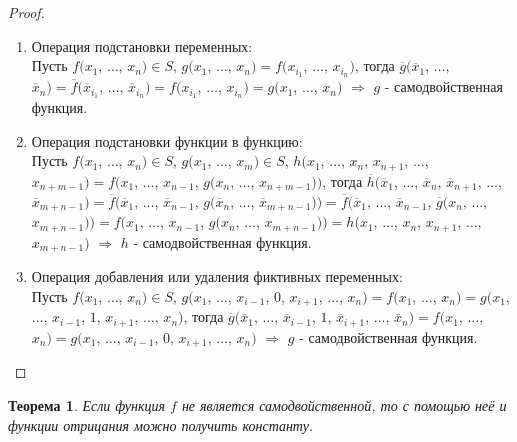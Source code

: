 \documentclass[a4paper, 12pt]{article}
\theoremstyle{definition}
\theoremstyle{plain}
\newtheorem*{theorem}{Теорема}
\theoremstyle{remark}
\begin{document}
  \begin{proof}
    \begin{enumerate}
      \item Операция подстановки переменных:\\
      Пусть $f(x_1$, $\ldots$, $x_n)\in S$, $g(x_1$, $\ldots$, $x_n)=f(x_{i_1}$, $\ldots$, $x_{i_n})$, тогда $\overline{g}(\overline{x}_1$, $\ldots$, $\overline{x}_n)=\overline{f}(\overline{x}_{i_1}$, $\ldots$, $\overline{x}_{i_n})=f(x_{i_1}$, $\ldots$, $x_{i_n})=g(x_1$, $\ldots$, $x_n)$ $\Longrightarrow$ $g$ - самодвойственная функция.
      \item Операция подстановки функции в функцию:\\
      Пусть $f(x_1$, $\ldots$, $x_n)\in S$, $g(x_1$, $\ldots$, $x_m)\in S$, $h(x_1$, $\ldots$, $x_n$, $x_{n+1}$, $\ldots$, $x_{n+m-1})=f(x_1$, $\ldots$, $x_{n-1}$, $g(x_n$, $\ldots$, $x_{n+m-1}))$, тогда $\overline{h}(\overline{x}_1$, $\ldots$, $\overline{x}_n$, $\overline{x}_{n+1}$, $\ldots$, $\overline{x}_{m+n-1})=\overline{f}(\overline{x}_1$, $\ldots$, $\overline{x}_{n-1}$, $g(\overline{x}_{n}$, $\ldots$, $\overline{x}_{m+n-1}))=\overline{f}(\overline{x}_1$, $\ldots$, $\overline{x}_{n-1}$, $\overline{g}(x_{n}$, $\ldots$, $x_{m+n-1}))=f(x_1$, $\ldots$, $x_{n-1}$, $g(x_{n}$, $\ldots$, $x_{m+n-1}))=h(x_1$, $\ldots$, $x_n$, $x_{n+1}$, $\ldots$, $x_{m+n-1})$ $\Longrightarrow$ $h$ - самодвойственная функция.
      \item Операция добавления или удаления фиктивных переменных:\\
      Пусть $f(x_1$, $\ldots$, $x_n)\in S$, $g(x_1$, $\ldots$, $x_{i-1}$, $0$, $x_{i+1}$, $\ldots$,  $x_n) = f(x_1$, $\ldots$, $x_n)=g(x_1$, $\ldots$, $x_{i-1}$, $1$, $x_{i+1}$, $\ldots$,  $x_n)$, тогда $\overline{g}(\overline{x}_1$, $\ldots$, $\overline{x}_{i-1}$, $1$, $\overline{x}_{i+1}$, $\ldots$,  $\overline{x}_n) = f(x_1$, $\ldots$, $x_n)=g(x_1$, $\ldots$, $x_{i-1}$, $0$, $x_{i+1}$, $\ldots$,  $x_n)$ $\Longrightarrow$ $g$ - самодвойственная функция. 
    \end{enumerate}
  \end{proof}
  \begin{theorem}
    Если функция $f$ не является самодвойственной, то с помощью неё и функции отрицания можно получить константу.
  \end{theorem}
\end{document}
